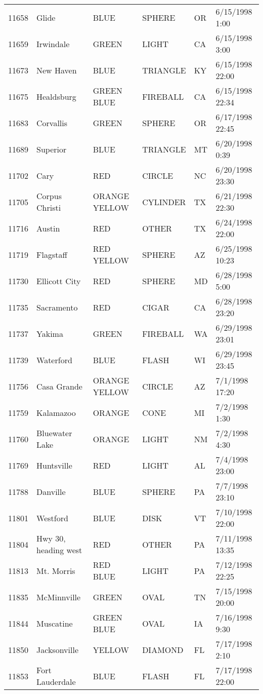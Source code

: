 \begin{tabular}{llllll}
11658 & Glide & BLUE & SPHERE & OR & 6/15/1998 1:00 \\
11659 & Irwindale & GREEN & LIGHT & CA & 6/15/1998 3:00 \\
11673 & New Haven & BLUE & TRIANGLE & KY & 6/15/1998 22:00 \\
11675 & Healdsburg & GREEN BLUE & FIREBALL & CA & 6/15/1998 22:34 \\
11683 & Corvallis & GREEN & SPHERE & OR & 6/17/1998 22:45 \\
11689 & Superior & BLUE & TRIANGLE & MT & 6/20/1998 0:39 \\
11702 & Cary & RED & CIRCLE & NC & 6/20/1998 23:30 \\
11705 & Corpus Christi & ORANGE YELLOW & CYLINDER & TX & 6/21/1998 22:30 \\
11716 & Austin & RED & OTHER & TX & 6/24/1998 22:00 \\
11719 & Flagstaff & RED YELLOW & SPHERE & AZ & 6/25/1998 10:23 \\
11730 & Ellicott City & RED & SPHERE & MD & 6/28/1998 5:00 \\
11735 & Sacramento & RED & CIGAR & CA & 6/28/1998 23:20 \\
11737 & Yakima & GREEN & FIREBALL & WA & 6/29/1998 23:01 \\
11739 & Waterford & BLUE & FLASH & WI & 6/29/1998 23:45 \\
11756 & Casa Grande & ORANGE YELLOW & CIRCLE & AZ & 7/1/1998 17:20 \\
11759 & Kalamazoo & ORANGE & CONE & MI & 7/2/1998 1:30 \\
11760 & Bluewater Lake & ORANGE & LIGHT & NM & 7/2/1998 4:30 \\
11769 & Huntsville & RED & LIGHT & AL & 7/4/1998 23:00 \\
11788 & Danville & BLUE & SPHERE & PA & 7/7/1998 23:10 \\
11801 & Westford & BLUE & DISK & VT & 7/10/1998 22:00 \\
11804 & Hwy 30, heading west & RED & OTHER & PA & 7/11/1998 13:35 \\
11813 & Mt. Morris & RED BLUE & LIGHT & PA & 7/12/1998 22:25 \\
11835 & McMinnville & GREEN & OVAL & TN & 7/15/1998 20:00 \\
11844 & Muscatine & GREEN BLUE & OVAL & IA & 7/16/1998 9:30 \\
11850 & Jacksonville & YELLOW & DIAMOND & FL & 7/17/1998 2:10 \\
11853 & Fort Lauderdale & BLUE & FLASH & FL & 7/17/1998 22:00 \\

\end{tabular}
